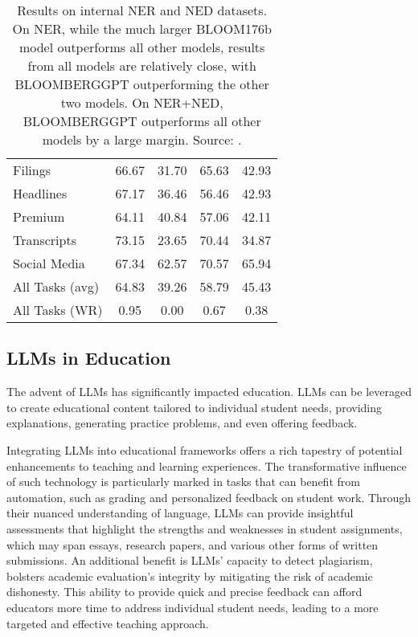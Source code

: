 \begin{table}[h!]
\begin{tabularx}{\textwidth}{Xcccc}
		Filings         & 66.67                 & 31.70             & 65.63                           & 42.93                              \\
		Headlines       & 67.17                 & 36.46             & 56.46                           & 42.93                              \\
		Premium         & 64.11                 & 40.84             & 57.06                           & 42.11                              \\
		Transcripts     & 73.15                 & 23.65             & 70.44                           & 34.87                              \\
		Social Media    & 67.34                 & 62.57             & 70.57                           & 65.94                              \\
		\midrule
		All Tasks (avg) & 64.83                 & 39.26             & 58.79                           & 45.43                              \\
		All Tasks (WR)  & 0.95                  & 0.00              & 0.67                            & 0.38                               \\
		\bottomrule
	\end{tabularx}
	\caption{Results on internal NER and NED datasets. On NER, while the much larger BLOOM176b model outperforms all other models, results from all models are relatively close, with BLOOMBERGGPT outperforming the other two models. On NER+NED, BLOOMBERGGPT outperforms all other models by a large margin. Source: \textcite{wu2023bloomberggpt}.}
	\label{tab:ner_ned_results}
\end{table}

\subsection{LLMs in Education}
\label{subsec:llms-in-education}

The advent of LLMs has significantly impacted education.
LLMs can be leveraged to create educational content tailored to individual student needs, providing explanations, generating practice problems, and even offering feedback.

Integrating LLMs into educational frameworks offers a rich tapestry of potential enhancements to teaching and learning experiences.
The transformative influence of such technology is particularly marked in tasks that can benefit from automation, such as grading and personalized feedback on student work.
Through their nuanced understanding of language, LLMs can provide insightful assessments that highlight the strengths and weaknesses in student assignments, which may span essays, research papers, and various other forms of written submissions.
An additional benefit is LLMs' capacity to detect plagiarism, bolsters academic evaluation's integrity by mitigating the risk of academic dishonesty.
This ability to provide quick and precise feedback can afford educators more time to address individual student needs, leading to a more targeted and effective teaching approach.

